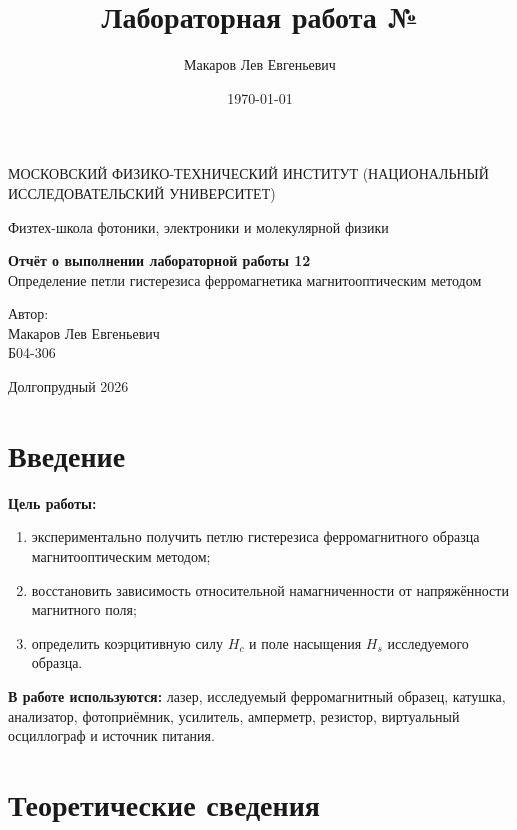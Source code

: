 \documentclass[a4paper,12pt]{article}
\author{Макаров Лев Евгеньевич}
\title{Лабораторная работа №\labnumber\\\labname}
\date{\today}
\newcommand\labname{Определение петли гистерезиса ферромагнетика магнитооптическим методом}
\newcommand\labnumber{12}
\begin{document}
\begin{titlepage}
    \begin{center}
        {\large МОСКОВСКИЙ ФИЗИКО-ТЕХНИЧЕСКИЙ ИНСТИТУТ (НАЦИОНАЛЬНЫЙ ИССЛЕДОВАТЕЛЬСКИЙ УНИВЕРСИТЕТ)}
    \end{center}
    \begin{center}
        {\large Физтех-школа фотоники, электроники и молекулярной физики}
    \end{center}

    \vspace{4.5cm}
    {\huge
        \begin{center}
            {\bf Отчёт о выполнении лабораторной работы \labnumber}\\
            \labname
        \end{center}
    }
    \vspace{2cm}
    \begin{flushright}
        {\LARGE Автор:\\ Макаров Лев Евгеньевич\\
        \vspace{0.2cm}
        Б04-306}
    \end{flushright}
    \vspace{8cm}
    \begin{center}
        Долгопрудный 2026
    \end{center}
\end{titlepage}

\section{Введение}

\textbf{Цель работы:}
\begin{enumerate}
    \item экспериментально получить петлю гистерезиса ферромагнитного образца магнитооптическим методом;
    \item восстановить зависимость относительной намагниченности от напряжённости магнитного поля;
    \item определить коэрцитивную силу $H_c$ и поле насыщения $H_s$ исследуемого образца.
\end{enumerate}

\textbf{В работе используются:} лазер, исследуемый ферромагнитный образец, катушка, анализатор, фотоприёмник, усилитель, амперметр, резистор, виртуальный осциллограф и источник питания.

\section{Теоретические сведения}
\end{document}
